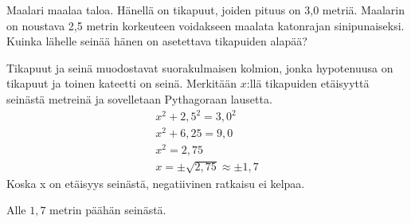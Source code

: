 \begin{esimerkki}
	Maalari maalaa taloa. Hänellä on tikapuut, joiden pituus on 3,0 metriä. Maalarin on
	noustava 2,5 metrin korkeuteen voidakseen maalata katonrajan sinipunaiseksi. Kuinka
	lähelle seinää hänen on asetettava tikapuiden alapää?
	\begin{esimratk}
		Tikapuut ja seinä muodostavat suorakulmaisen kolmion, jonka hypotenuusa on tikapuut
		ja toinen kateetti on seinä. Merkitään $x$:llä tikapuiden etäisyyttä seinästä
		metreinä ja sovelletaan Pythagoraan lausetta.
		\begin{align*}
		x^2 + 2,5^2 = 3,0^2 \\
		x^2 + 6,25 = 9,0 \\
		x^2 = 2,75 \\
		x = \pm \sqrt{2,75} \approx \pm 1,7
		\end{align*}
		Koska x on etäisyys seinästä, negatiivinen ratkaisu ei kelpaa.
		\begin{esimvast}
		Alle $1,7$ metrin päähän seinästä. 
		\end{esimvast}
	\end{esimratk}
\end{esimerkki}

